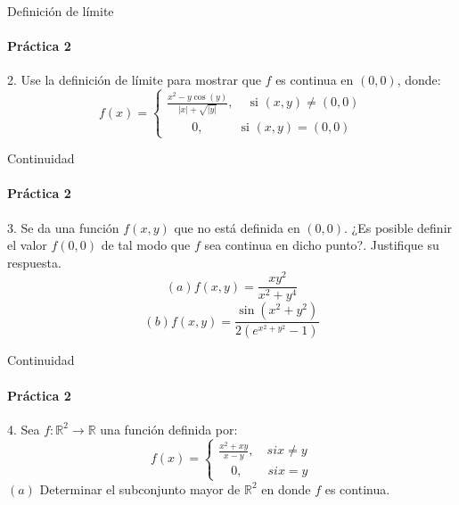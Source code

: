 \documentclass{plantillaPPT}
\begin{document}
\begin{frame}{Definición de límite}
\framesubtitle{Práctica 2}

2. Use la definición de límite para mostrar que \(f\) es continua en \((0,0)\), donde:
\[
f(x) =
\begin{cases}
\frac{x^2-y\cos(y)}{|x|+\sqrt{|y|}}, \quad \;\text{si }(x,y)\neq(0,0) \\
 \quad \quad 0, \quad \quad \quad \text{si }(x,y) = (0,0)
\end{cases}
\]
    
\end{frame}

\begin{frame}{Continuidad}
\framesubtitle{Práctica 2}

3. Se da una función \(f(x,y)\) que no está definida en \((0,0)\). ¿Es posible definir el valor \(f(0,0)\) de tal modo que \(f\) sea continua en dicho punto?. Justifique su respuesta.
\[(a) f(x,y)=\frac{xy^2}{x^2+y^4}\]
\[(b) f(x,y)=\frac{\sin(x^2+y^2)}{2(e^{x^2+y^2}-1)}\]
    
\end{frame}

\begin{frame}{Continuidad}
\framesubtitle{Práctica 2}

4. Sea \(f: \mathbb{R}^2\to\mathbb{R}\) una función definida por:
\[
f(x) = 
\begin{cases}
\frac{x^2+xy}{x-y}, \quad si x\neq y \\
\quad 0, \quad \quad si x=y 
\end{cases}
\]
\((a)\) Determinar el subconjunto mayor de \(\mathbb{R}^2\) en donde \(f\) es continua.\\
\end{frame}
\end{document}
